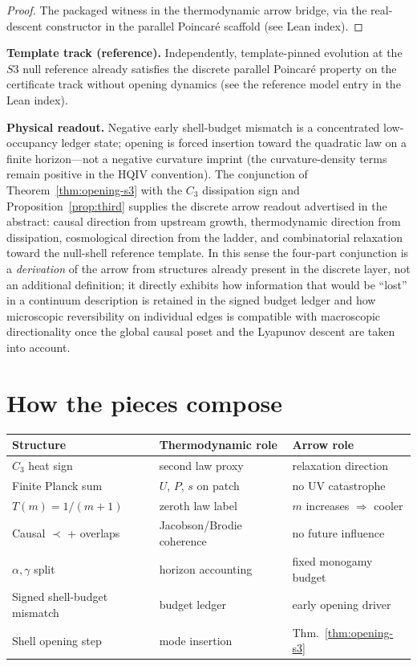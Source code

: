 \documentclass[11pt]{amsart}
\begin{document}
\begin{proof}
The packaged witness in the thermodynamic arrow bridge, via the real-descent
constructor in the parallel Poincar\'e scaffold (see Lean index).
\end{proof}

\textbf{Template track (reference).}
Independently, template-pinned evolution at the $S3$ null reference already satisfies
the discrete parallel Poincar\'e property on the certificate track without opening
dynamics (see the reference model entry in the Lean index).

\textbf{Physical readout.}
Negative early shell-budget mismatch is a concentrated low-occupancy ledger state;
opening is forced insertion toward the quadratic law on a finite horizon---not a negative
curvature imprint (the curvature-density terms remain positive in the HQIV convention).
The conjunction of Theorem~\ref{thm:opening-s3} with the $C_3$ dissipation sign and
Proposition~\ref{prop:third} supplies the discrete arrow readout advertised in the
abstract: causal direction from upstream growth, thermodynamic direction from
dissipation, cosmological direction from the ladder, and combinatorial relaxation
toward the null-shell reference template.  In this sense the four-part conjunction is
a \emph{derivation} of the arrow from structures already present in the discrete layer,
not an additional definition; it directly exhibits how information that would be
``lost'' in a continuum description is retained in the signed budget ledger and how
microscopic reversibility on individual edges is compatible with macroscopic
directionality once the global causal poset and the Lyapunov descent are taken into
account.

\section{How the pieces compose}
\label{sec:compose}

\begin{center}
\begin{tabular}{@{}lll@{}}
\toprule
\textbf{Structure} & \textbf{Thermodynamic role} & \textbf{Arrow role} \\
\midrule
$C_3$ heat sign & second law proxy & relaxation direction \\
Finite Planck sum & $U$, $P$, $s$ on patch & no UV catastrophe \\
$T(m)=1/(m+1)$ & zeroth law label & $m$ increases $\Rightarrow$ cooler \\
Causal $\prec$ + overlaps & Jacobson/Brodie coherence & no future influence \\
$\alpha,\gamma$ split & horizon accounting & fixed monogamy budget \\
Signed shell-budget mismatch & budget ledger & early opening driver \\
Shell opening step & mode insertion & Thm.~\ref{thm:opening-s3} \\
\bottomrule
\end{tabular}
\end{center}
\end{document}
